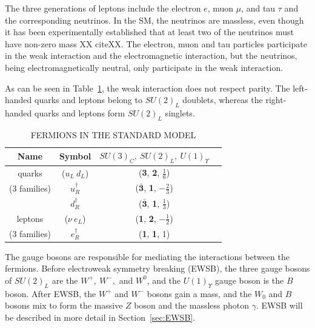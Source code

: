 The three generations of leptons include the electron $e$, muon $\mu$, and tau $\tau$ and the corresponding neutrinos. In the SM, the neutrinos are massless, even though it has been experimentally established that at least two of the neutrinos must have non-zero mass XX citeXX. The electron, muon and tau particles participate in the weak interaction and the electromagnetic interaction, but the neutrinos, being electromagnetically neutral, only participate in the weak interaction. 

As can be seen in Table~\ref{tab:fermions}, the weak interaction does not respect parity. The left-handed quarks and leptons belong to $SU(2)_L$ doublets, whereas the right-handed quarks and leptons form $SU(2)_L$ singlets.

\begin{table}[ht]
    \caption{FERMIONS IN THE STANDARD MODEL}
    \centering
    \begin{tabular}{|c|c|c|c|}
    \hline
    \hline
    Name  & Symbol & $SU(3)_C,~SU(2)_L,~U(1)_\Upsilon $\\
  	  \hline
           \hline    
quarks        & ($u_L~d_L$)     & (\textbf{3}, \textbf{2}, $\frac{1}{6}$) \\
(3 families) & $u_R^\dagger$ & ($\bar{\textbf{3}}$, \textbf{1}, $-\frac{2}{3}$) \\
                   & $d_R^\dagger$ & ($\bar{\textbf{3}}$, \textbf{1}, $\frac{1}{3}$) \\
                   \hline
leptons       & ($\nu~e_L$)      &  (\textbf{1}, \textbf{2}, $-\frac{1}{2}$) \\
(3 families) & $e_R^\dagger$ &  (\textbf{1}, \textbf{1}, 1) \\
           \hline
           \hline
    \end{tabular}
    \label{tab:fermions}
\end{table}


The gauge bosons are responsible for mediating the interactions between the fermions. Before electroweak symmetry breaking (EWSB), the three gauge bosons of $SU(2)_L$ are the $W^+,~W^-,$ and $W^0$, and the $U(1)_\Upsilon$ gauge boson is the $B$ boson. After EWSB, the $W^+$ and $W^-$ bosons gain a mass, and the $W_0$ and $B$ bosons mix to form the massive $Z$ boson and the massless photon $\gamma$. EWSB will be described in more detail in Section~\ref{sec:EWSB}.

